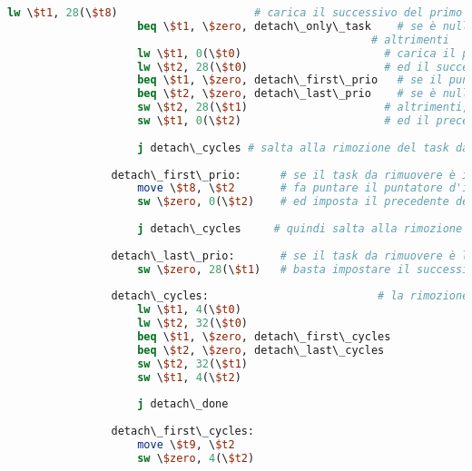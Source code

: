 \begin{center}
\begin{lstlisting}[language=mips, gobble=14, stepnumber=1]
                    lw \$t1, 28(\$t8)                     # carica il successivo del primo task nella lista A
                    beq \$t1, \$zero, detach\_only\_task    # se è nullo, allora c'è un solo task nella coda (rimuoverlo equivale a svuotare la coda)
                                                        # altrimenti
                    lw \$t1, 0(\$t0)                      # carica il precedente del task da rimuovere
                    lw \$t2, 28(\$t0)                     # ed il successivo
                    beq \$t1, \$zero, detach\_first\_prio   # se il puntatore al precedente è nullo, allora è da rimuovere il primo task della lista A
                    beq \$t2, \$zero, detach\_last\_prio    # se è nullo il puntatore al successivo, allora è l'ultimo
                    sw \$t2, 28(\$t1)                     # altrimenti, imposta il successivo come successivo del precedente
                    sw \$t1, 0(\$t2)                      # ed il precedente come precedente del successivo
                    
                    j detach\_cycles # salta alla rimozione del task dalla lista B
                    
                detach\_first\_prio:      # se il task da rimuovere è il primo della lista A
                    move \$t8, \$t2       # fa puntare il puntatore d'inizio di A al task successivo (ovvero il secondo)
                    sw \$zero, 0(\$t2)    # ed imposta il precedente del successivo come puntatore nullo
                    
                    j detach\_cycles     # quindi salta alla rimozione dalla lista B
                    
                detach\_last\_prio:       # se il task da rimuovere è l'ultimo della lista A
                    sw \$zero, 28(\$t1)   # basta impostare il successivo del task precedente come puntatore nullo
                    
                detach\_cycles:                          # la rimozione dalla lista B è del tutto analoga a quella della lista A
                    lw \$t1, 4(\$t0)
                    lw \$t2, 32(\$t0)
                    beq \$t1, \$zero, detach\_first\_cycles
                    beq \$t2, \$zero, detach\_last\_cycles
                    sw \$t2, 32(\$t1)
                    sw \$t1, 4(\$t2)
                    
                    j detach\_done
                    
                detach\_first\_cycles:
                    move \$t9, \$t2
                    sw \$zero, 4(\$t2)
                    

\end{lstlisting}
\end{center}
